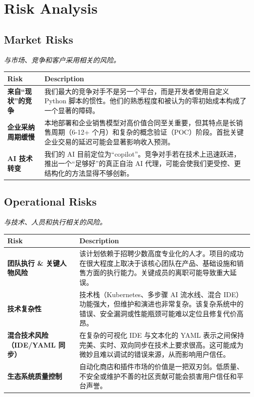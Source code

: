 \documentclass[11pt, a4paper, oneside]{article}
\begin{document}
\newpage
\section{Risk Analysis}
\subsection{Market Risks}
\textit{与市场、竞争和客户采用相关的风险。}

\begin{table}[H]
\centering
\begin{tabularx}{\textwidth}{@{}lL@{}}
\toprule
\textbf{Risk} & \textbf{Description} \\
\midrule
\textbf{来自“现状”的竞争} & 我们最大的竞争对手不是另一个平台，而是开发者使用自定义 Python 脚本的惯性。他们的熟悉程度和被认为的零初始成本构成了一个显著的障碍。 \\
\addlinespace
\textbf{企业采纳周期缓慢} & 本地部署和企业销售模型对高价值合同至关重要，但其特点是长销售周期（6-12+ 个月）和复杂的概念验证（POC）阶段。首批关键企业交易的延迟可能会显著影响收入预测。 \\
\addlinespace
\textbf{AI 技术转变} & 我们的 AI 目前定位为“copilot”。竞争对手若在技术上迅速跃进，推出一个“足够好”的真正自治 AI 代理，可能会使我们更受控、更结构化的方法显得不够创新。 \\
\bottomrule
\end{tabularx}
\end{table}

\newpage
\subsection{Operational Risks}
\textit{与技术、人员和执行相关的风险。}

\begin{table}[H]
\centering
\begin{tabularx}{\textwidth}{@{}lL@{}}
\toprule
\textbf{Risk} & \textbf{Description} \\
\midrule
\textbf{团队执行 \& 关键人物风险} & 该计划依赖于招聘少数高度专业化的人才。项目的成功在很大程度上取决于该核心团队在产品、基础设施和销售方面的执行能力。关键成员的离职可能导致重大延误。 \\



\addlinespace
\textbf{技术复杂性} & 技术栈（Kubernetes、多步骤 AI 流水线、混合 IDE）功能强大，但维护和演进也非常复杂。该复杂系统中的错误、安全漏洞或性能瓶颈可能难以定位且修复代价高昂。 \\
\addlinespace
\textbf{混合技术风险（IDE/YAML 同步）} & 在复杂的可视化 IDE 与文本化的 YAML 表示之间保持完美、实时、双向同步在技术上要求很高。这可能成为微妙且难以调试的错误来源，从而影响用户信任。 \\
\addlinespace
\textbf{生态系统质量控制} & 自动化商店和插件市场的价值是一把双刃剑。低质量、不安全或维护不善的社区贡献可能会损害用户信任和平台声誉。 \\
\bottomrule
\end{tabularx}
\end{table}
\end{document}
